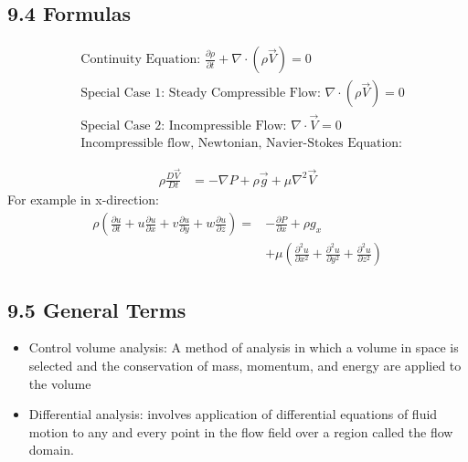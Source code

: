 \documentclass[10pt]{article}
\begin{document}
\begin{multicols*}{2}
\subsection*{9.4 Formulas}
\vspace{-0.4cm}
\begin{fleqn}
\begin{align*}
    &\text{Continuity Equation: } \frac{\partial \rho}{\partial t} + \nabla \cdot (\rho \vec{V}) = 0 \\
    &\text{Special Case 1: Steady Compressible Flow: } \nabla \cdot (\rho \vec{V}) = 0 \\
    &\text{Special Case 2: Incompressible Flow: } \nabla \cdot \vec{V} = 0 \\
    &\text{Incompressible flow, Newtonian, Navier-Stokes Equation:}
\end{align*}
\end{fleqn}
\vspace{-1.0cm}
\begin{align*}
    \rho \frac{ D \vec{V}}{D t}  &= -\nabla P + \rho \vec{g} + \mu \nabla^2 \vec{V} 
\end{align*}
For example in x-direction:
\begin{align*}
    \rho \left(\frac{\partial u}{\partial t} + u \frac{\partial u}{\partial x} + v \frac{\partial u}{\partial y} + w \frac{\partial u}{\partial z}\right) 
    = &-\frac{\partial P}{\partial x} + \rho g_x \\
    &+ \mu \left(\frac{\partial^2 u}{\partial x^2} + \frac{\partial^2 u}{\partial y^2} + \frac{\partial^2 u}{\partial z^2}\right)
\end{align*}
\vspace{-0.5cm}
\subsection*{9.5 General Terms}
\begin{itemize}
    \item Control volume analysis: A method of analysis in which a volume in space is selected and the conservation of mass, momentum, and energy are applied to the volume
    \item Differential analysis: involves application of differential equations of fluid motion to any and every point in the flow field over a region called the flow domain.
\end{itemize}

\end{multicols*}
\end{document}
